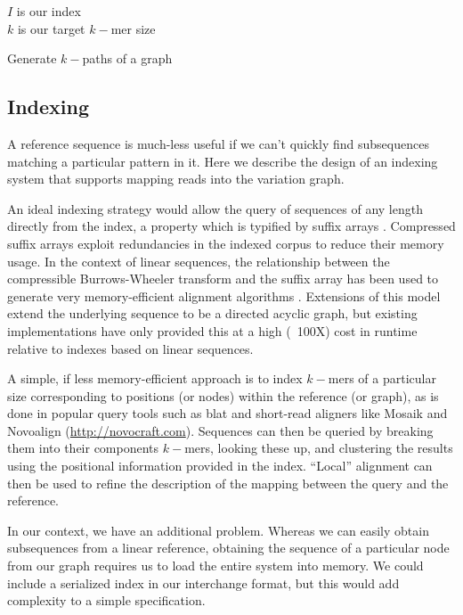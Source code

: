 \documentclass{article}
\begin{document}
\begin{algorithm}[h!]
  $I$ is our index \\
  $k$ is our target $k-$mer size \\
  \caption{
\label{alg:kpaths}
Generate $k-$paths of a graph
}
\end{algorithm}


\subsection{Indexing}

A reference sequence is much-less useful if we can't quickly find subsequences matching a particular pattern in it. Here we describe the design of an indexing system that supports mapping reads into the variation graph.

An ideal indexing strategy would allow the query of sequences of any length directly from the index, a property which is typified by suffix arrays \cite{puglisi2007taxonomy}. Compressed suffix arrays exploit redundancies in the indexed corpus to reduce their memory usage. In the context of linear sequences, the relationship between the compressible Burrows-Wheeler transform and the suffix array has been used to generate very memory-efficient alignment algorithms \cite{li2013aligning}. Extensions of this model extend the underlying sequence to be a directed acyclic graph, but existing implementations have only provided this at a high (~100X) cost in runtime \cite{siren2011indexing, huang2013short} relative to indexes based on linear sequences.

A simple, if less memory-efficient approach is to index $k-$mers of a particular size corresponding to positions (or nodes) within the reference (or graph), as is done in popular query tools such as blat \cite{kent2002blat} and short-read aligners like Mosaik \cite{lee2014mosaik} and Novoalign (\url{http://novocraft.com}).
Sequences can then be queried by breaking them into their components $k-$mers, looking these up, and clustering the results using the positional information provided in the index.
``Local'' alignment can then be used to refine the description of the mapping between the query and the reference.

In our context, we have an additional problem. Whereas we can easily obtain subsequences from a linear reference, obtaining the sequence of a particular node from our graph requires us to load the entire system into memory. We could include a serialized index in our interchange format, but this would add complexity to a simple specification.
\end{document}
